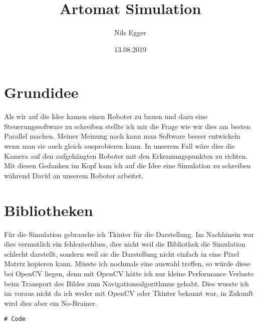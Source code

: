 \documentclass[12pt]{article}
\title{Artomat Simulation}
\author{Nils Egger}
\date{13.08.2019}
\begin{document}
\maketitle

\section{Grundidee}

Als wir auf die Idee kamen einen Roboter zu bauen und dazu eine Steuerungssoftware zu schreiben stellte ich mir die Frage wie wir dies am besten Parallel machen. Meiner Meinung nach kann man Software besser entwickeln wenn man sie auch gleich ausprobieren kann. In unserem Fall wäre dies die Kamera auf den aufgehängten Roboter mit den Erkennungspunkten zu richten. Mit diesen Gedanken im Kopf kam ich auf die Idee eine Simulation zu schreiben während David an unserem Roboter arbeitet.

\section{Bibliotheken}
Für die Simulation gebrauche ich Tkinter für die Darstellung. Im Nachhinein war dies vermutlich ein fehlentschluss, dies nicht weil die Bibliothek die Simulation schlecht darstellt, sondern weil sie die Darstellung nicht einfach in eine Pixel Matrix kopieren kann.
Müsste ich nochmals eine auswahl treffen, so würde diese bei OpenCV liegen, denn mit OpenCV hätte ich nur kleine Performance Verluste beim Transport des Bildes zum Navigationsalgorithmus gehabt. Dies wusste ich im voraus nicht da ich weder mit OpenCV oder Tkinter bekannt war, in Zukunft wird dies aber ein No-Brainer.

\begin{lstlisting}
# Code
\end{lstlisting}
\end{document}
